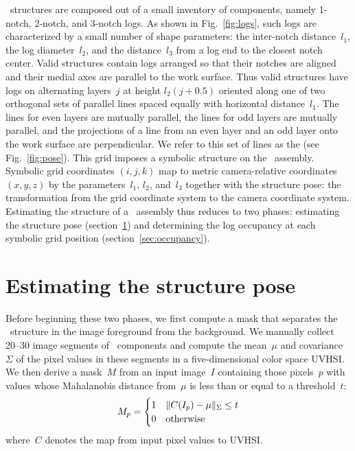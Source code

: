 \LincolnLog\ structures are composed out of a small inventory of components,
namely 1-notch, 2-notch, and 3-notch logs.
%
As shown in Fig.~\ref{fig:logs}, such logs are characterized by a small number
of shape parameters: the inter-notch distance~$l_1$, the log diameter~$l_2$, and
the distance~$l_3$ from a log end to the closest notch center.
%
Valid structures contain logs arranged so that their notches are aligned and
their medial axes are parallel to the work surface.
%
Thus valid structures have logs on alternating layers~$j$ at
height $l_2(j+0.5)$ oriented along one of two orthogonal sets of parallel lines
spaced equally with horizontal distance~$l_1$.
%
The lines for even layers are mutually parallel, the lines for odd layers are
mutually parallel, and the projections of a line from an even layer and an odd
layer onto the work surface are perpendicular.
%
We refer to this set of lines as the  (see Fig.~\ref{fig:pose}).
%
This grid imposes a symbolic structure on the \LincolnLog\ assembly.
%
Symbolic grid coordinates $(i,j,k)$ map to metric camera-relative
coordinates $(x,y,z)$ by the parameters~$l_1$, $l_2$, and~$l_3$ together with
the structure pose: the transformation from the grid coordinate system to the
camera coordinate system.
%
Estimating the structure of a \LincolnLog\ assembly thus reduces to two phases:
estimating the structure pose (section~\ref{sec:pose}) and determining the
log occupancy at each symbolic grid position (section~\ref{sec:occupancy}).

\section{Estimating the structure pose}
\label{sec:pose}

Before beginning these two phases, we first compute a mask that separates the
\LincolnLog\ structure in the image foreground from the background.
%
We manually collect 20--30 image segments of \LincolnLog\ components and compute
the mean~$\mu$ and covariance~$\Sigma$ of the pixel values in these segments in
a five-dimensional color space UVHSI.\@
%
We then derive a mask~$M$ from an input image~$I$ containing those pixels~$p$
with values whose Mahalanobis distance from~$\mu$ is less than or equal to a
threshold~$t$:
%
\[M_p =
\begin{cases}
  1 & \lVert C(I_p) - \mu\rVert_{\Sigma}\leq t\\
  0 & \textrm{otherwise}\\
\end{cases}\]
%
where~$C$ denotes the map from input pixel values to UVHSI.\@

